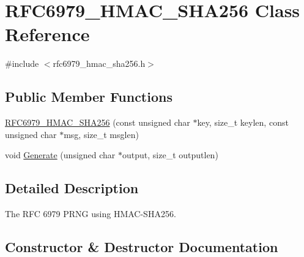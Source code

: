 \hypertarget{class_r_f_c6979___h_m_a_c___s_h_a256}{}\section{R\+F\+C6979\+\_\+\+H\+M\+A\+C\+\_\+\+S\+H\+A256 Class Reference}
\label{class_r_f_c6979___h_m_a_c___s_h_a256}


{\ttfamily \#include $<$rfc6979\+\_\+hmac\+\_\+sha256.\+h$>$}

\subsection*{Public Member Functions}
\begin{DoxyCompactItemize}
\item 
\mbox{\hyperlink{class_r_f_c6979___h_m_a_c___s_h_a256_aeab9ec7d2a564e2d98f2157ee7b83bef}{R\+F\+C6979\+\_\+\+H\+M\+A\+C\+\_\+\+S\+H\+A256}} (const unsigned char $\ast$key, size\+\_\+t keylen, const unsigned char $\ast$msg, size\+\_\+t msglen)
\item 
void \mbox{\hyperlink{class_r_f_c6979___h_m_a_c___s_h_a256_a9f841d552097f528631538e9939e0f70}{Generate}} (unsigned char $\ast$output, size\+\_\+t outputlen)
\end{DoxyCompactItemize}


\subsection{Detailed Description}
The R\+FC 6979 P\+R\+NG using H\+M\+A\+C-\/\+S\+H\+A256. 

\subsection{Constructor \& Destructor Documentation}
\mbox{\label{class_r_f_c6979___h_m_a_c___s_h_a256_aeab9ec7d2a564e2d98f2157ee7b83bef}} 
